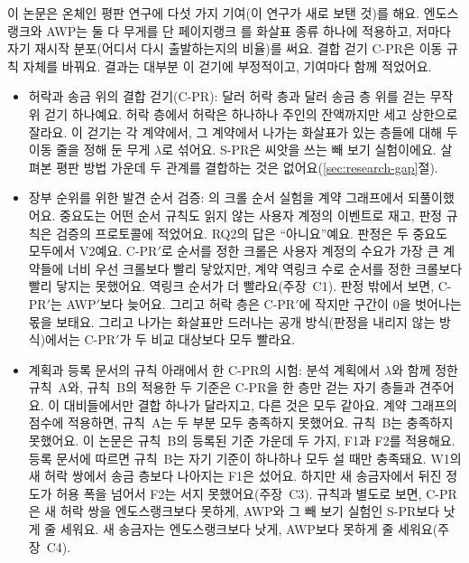이 논문은 온체인 평판 연구에 다섯 가지 기여(이 연구가 새로 보탠 것)를 해요. 엔도스랭크와 AWP는 둘 다 무게를 단 페이지랭크 \parencite{page1999pagerank}를 화살표 종류 하나에 적용하고, 저마다 자기 재시작 분포(어디서 다시 출발하는지의 비율)를 써요. 결합 걷기 \mbox{C-PR}은 이동 규칙 자체를 바꿔요. 결과는 대부분 이 걷기에 부정적이고, 기여마다 함께 적었어요.
\begin{itemize}
\item 허락과 송금 위의 결합 걷기(\mbox{C-PR}): 달러 허락 층과 달러 송금 층 위를 걷는 무작위 걷기 하나예요. 허락 층에서 허락은 하나하나 주인의 잔액까지만 세고 상한으로 잘라요. 이 걷기는 각 계약에서, 그 계약에서 나가는 화살표가 있는 층들에 대해 두 이동 줄을 정해 둔 무게 $\lambda$로 섞어요. \mbox{S-PR}은 씨앗을 쓰는 빼 보기 실험이에요. 살펴본 평판 방법 가운데 두 관계를 결합하는 것은 없어요(\ref{sec:research-gap}절).
\item 장부 순위를 위한 발견 순서 검증: \textcite{cho1998crawling}의 크롤 순서 실험을 계약 그래프에서 되풀이했어요. 중요도는 어떤 순서 규칙도 읽지 않는 사용자 계정의 이벤트로 재고, 판정 규칙은 검증의 프로토콜에 적었어요. RQ2의 답은 “아니요”예요. 판정은 두 중요도 모두에서 V2예요. \mbox{C-PR}$'$로 순서를 정한 크롤은 사용자 계정의 수요가 가장 큰 계약들에 너비 우선 크롤보다 빨리 닿았지만, 계약 역링크 수로 순서를 정한 크롤보다 빨리 닿지는 못했어요. 역링크 순서가 더 빨라요(주장~C1). 판정 밖에서 보면, \mbox{C-PR}$'$는 AWP$'$보다 늦어요. 그리고 허락 층은 \mbox{C-PR}$'$에 작지만 구간이 0을 벗어나는 몫을 보태요. 그리고 나가는 화살표만 드러나는 공개 방식(판정을 내리지 않는 방식)에서는 \mbox{C-PR}$'$가 두 비교 대상보다 모두 빨라요.
\item 계획과 등록 문서의 규칙 아래에서 한 \mbox{C-PR}의 시험: 분석 계획에서 $\lambda$와 함께 정한 규칙~A와, 규칙~B의 적용한 두 기준은 \mbox{C-PR}을 한 층만 걷는 자기 층들과 견주어요. 이 대비들에서만 결합 하나가 달라지고, 다른 것은 모두 같아요. 계약 그래프의 점수에 적용하면, 규칙~A는 두 부분 모두 충족하지 못했어요. 규칙~B는 충족하지 못했어요. 이 논문은 규칙~B의 등록된 기준 가운데 두 가지, F1과 F2를 적용해요. 등록 문서에 따르면 규칙~B는 자기 기준이 하나하나 모두 설 때만 충족돼요. W1의 새 허락 쌍에서 송금 층보다 나아지는 F1은 섰어요. 하지만 새 송금자에서 뒤진 정도가 허용 폭을 넘어서 F2는 서지 못했어요(주장~C3). 규칙과 별도로 보면, \mbox{C-PR}은 새 허락 쌍을 엔도스랭크보다 못하게, AWP와 그 빼 보기 실험인 \mbox{S-PR}보다 낫게 줄 세워요. 새 송금자는 엔도스랭크보다 낫게, AWP보다 못하게 줄 세워요(주장~C4).

\end{itemize}
